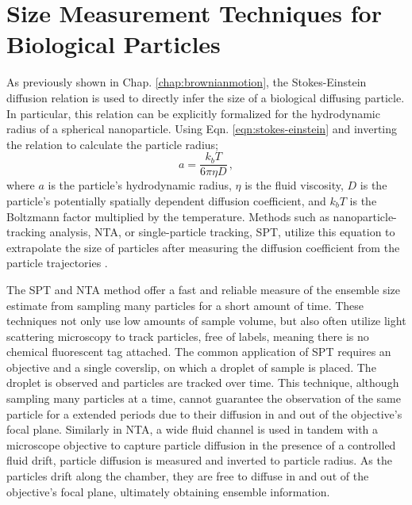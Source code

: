\clearpage
\section{Size Measurement Techniques for Biological Particles}

As previously shown in Chap. \ref{chap:brownianmotion}, the Stokes-Einstein diffusion relation is used to directly infer the size of a biological diffusing particle. In particular, this relation can be explicitly formalized for the hydrodynamic radius of a spherical nanoparticle. Using Eqn. \ref{eqn:stokes-einstein} and inverting the relation to calculate the particle radius;
\begin{equation}
    a = \frac{k_b T}{6\pi \eta D}\,,
\end{equation}
where $a$ is the particle's hydrodynamic radius, $\eta$ is the fluid viscosity, $D$ is the particle's potentially spatially dependent diffusion coefficient, and $k_bT$ is the Boltzmann factor multiplied by the temperature. Methods such as nanoparticle-tracking analysis, NTA, or single-particle tracking, SPT, utilize this equation to extrapolate the size of particles after measuring the diffusion coefficient from the particle trajectories \cite{midtvedtSizeRefractiveIndex2020, filipeCriticalEvaluationNanoparticle2010}. 

The SPT and NTA method offer a fast and reliable measure of the ensemble size estimate from sampling many particles for a short amount of time. These techniques not only use low amounts of sample volume, but also often utilize light scattering microscopy to track particles, free of labels, meaning there is no chemical fluorescent tag attached. The common application of SPT requires an objective and a single coverslip, on which a droplet of sample is placed. The droplet is observed and particles are tracked over time. This technique, although sampling many particles at a time, cannot guarantee the observation of the same particle for a extended periods due to their diffusion in and out of the objective's focal plane. Similarly in NTA, a wide fluid channel is used in tandem with a microscope objective to capture particle diffusion in the presence of a controlled fluid drift, particle diffusion is measured and inverted to particle radius. As the particles drift along the chamber, they are free to diffuse in and out of the objective's focal plane, ultimately obtaining ensemble information. 

